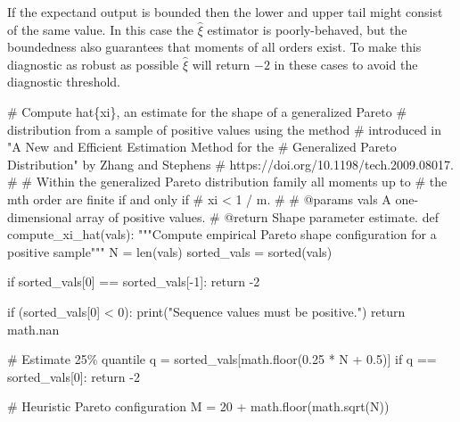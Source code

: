 \documentclass[
  letterpaper,
  DIV=11,
  numbers=noendperiod]{scrartcl}
\newenvironment{Shaded}{\begin{snugshade}}{\end{snugshade}}
\newcommand{\BuiltInTok}[1]{\textcolor[rgb]{0.00,0.23,0.31}{#1}}
\newcommand{\CommentTok}[1]{\textcolor[rgb]{0.37,0.37,0.37}{#1}}
\newcommand{\ControlFlowTok}[1]{\textcolor[rgb]{0.00,0.23,0.31}{#1}}
\newcommand{\DecValTok}[1]{\textcolor[rgb]{0.68,0.00,0.00}{#1}}
\newcommand{\FloatTok}[1]{\textcolor[rgb]{0.68,0.00,0.00}{#1}}
\newcommand{\KeywordTok}[1]{\textcolor[rgb]{0.00,0.23,0.31}{#1}}
\newcommand{\NormalTok}[1]{\textcolor[rgb]{0.00,0.23,0.31}{#1}}
\newcommand{\OperatorTok}[1]{\textcolor[rgb]{0.37,0.37,0.37}{#1}}
\newcommand{\StringTok}[1]{\textcolor[rgb]{0.13,0.47,0.30}{#1}}
\begin{document}
If the expectand output is bounded then the lower and upper tail might
consist of the same value. In this case the \(\hat{\xi}\) estimator is
poorly-behaved, but the boundedness also guarantees that moments of all
orders exist. To make this diagnostic as robust as possible
\(\hat{\xi}\) will return \(-2\) in these cases to avoid the diagnostic
threshold.

\begin{Shaded}
\begin{Highlighting}[]
\CommentTok{\# Compute hat\{xi\}, an estimate for the shape of a generalized Pareto}
\CommentTok{\# distribution from a sample of positive values using the method}
\CommentTok{\# introduced in "A New and Efficient Estimation Method for the}
\CommentTok{\# Generalized Pareto Distribution" by Zhang and Stephens}
\CommentTok{\# https://doi.org/10.1198/tech.2009.08017.}
\CommentTok{\#}
\CommentTok{\# Within the generalized Pareto distribution family all moments up to}
\CommentTok{\# the mth order are finite if and only if}
\CommentTok{\#  xi \textless{} 1 / m.}
\CommentTok{\#}
\CommentTok{\# @params vals A one{-}dimensional array of positive values.}
\CommentTok{\# @return Shape parameter estimate.}
\KeywordTok{def}\NormalTok{ compute\_xi\_hat(vals):}
  \CommentTok{"""Compute empirical Pareto shape configuration for a positive sample"""}
\NormalTok{  N }\OperatorTok{=} \BuiltInTok{len}\NormalTok{(vals)}
\NormalTok{  sorted\_vals }\OperatorTok{=} \BuiltInTok{sorted}\NormalTok{(vals)}
  
  \ControlFlowTok{if}\NormalTok{ sorted\_vals[}\DecValTok{0}\NormalTok{] }\OperatorTok{==}\NormalTok{ sorted\_vals[}\OperatorTok{{-}}\DecValTok{1}\NormalTok{]:}
    \ControlFlowTok{return} \OperatorTok{{-}}\DecValTok{2}
  
  \ControlFlowTok{if}\NormalTok{ (sorted\_vals[}\DecValTok{0}\NormalTok{] }\OperatorTok{\textless{}} \DecValTok{0}\NormalTok{):}
    \BuiltInTok{print}\NormalTok{(}\StringTok{"Sequence values must be positive."}\NormalTok{)}
    \ControlFlowTok{return}\NormalTok{ math.nan}
  
  \CommentTok{\# Estimate 25\% quantile}
\NormalTok{  q }\OperatorTok{=}\NormalTok{ sorted\_vals[math.floor(}\FloatTok{0.25} \OperatorTok{*}\NormalTok{ N }\OperatorTok{+} \FloatTok{0.5}\NormalTok{)]}
  \ControlFlowTok{if}\NormalTok{ q }\OperatorTok{==}\NormalTok{ sorted\_vals[}\DecValTok{0}\NormalTok{]:}
    \ControlFlowTok{return} \OperatorTok{{-}}\DecValTok{2}
    
  \CommentTok{\# Heuristic Pareto configuration}
\NormalTok{  M }\OperatorTok{=} \DecValTok{20} \OperatorTok{+}\NormalTok{ math.floor(math.sqrt(N))}
  

\end{Highlighting}
\end{Shaded}
\end{document}
